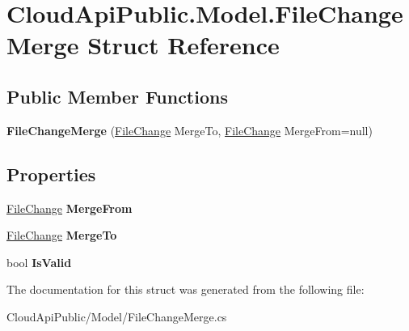 \hypertarget{struct_cloud_api_public_1_1_model_1_1_file_change_merge}{\section{Cloud\-Api\-Public.\-Model.\-File\-Change\-Merge Struct Reference}
\label{struct_cloud_api_public_1_1_model_1_1_file_change_merge}
}
\subsection*{Public Member Functions}
\begin{DoxyCompactItemize}
\item 
\hypertarget{struct_cloud_api_public_1_1_model_1_1_file_change_merge_ad841a9bbfbc41d406dabe10167b750ad}{{\bfseries File\-Change\-Merge} (\hyperlink{class_cloud_api_public_1_1_model_1_1_file_change}{File\-Change} Merge\-To, \hyperlink{class_cloud_api_public_1_1_model_1_1_file_change}{File\-Change} Merge\-From=null)}\label{struct_cloud_api_public_1_1_model_1_1_file_change_merge_ad841a9bbfbc41d406dabe10167b750ad}

\end{DoxyCompactItemize}
\subsection*{Properties}
\begin{DoxyCompactItemize}
\item 
\hypertarget{struct_cloud_api_public_1_1_model_1_1_file_change_merge_ae1e6fa957daa5680741c7f9bc136aff6}{\hyperlink{class_cloud_api_public_1_1_model_1_1_file_change}{File\-Change} {\bfseries Merge\-From}}\label{struct_cloud_api_public_1_1_model_1_1_file_change_merge_ae1e6fa957daa5680741c7f9bc136aff6}

\item 
\hypertarget{struct_cloud_api_public_1_1_model_1_1_file_change_merge_ae068338443b73adfa14ddf9c7c11b5ba}{\hyperlink{class_cloud_api_public_1_1_model_1_1_file_change}{File\-Change} {\bfseries Merge\-To}}\label{struct_cloud_api_public_1_1_model_1_1_file_change_merge_ae068338443b73adfa14ddf9c7c11b5ba}

\item 
\hypertarget{struct_cloud_api_public_1_1_model_1_1_file_change_merge_a2532bffa04b1f680998f65a67efca6e4}{bool {\bfseries Is\-Valid}}\label{struct_cloud_api_public_1_1_model_1_1_file_change_merge_a2532bffa04b1f680998f65a67efca6e4}

\end{DoxyCompactItemize}


The documentation for this struct was generated from the following file\-:\begin{DoxyCompactItemize}
\item 
Cloud\-Api\-Public/\-Model/File\-Change\-Merge.\-cs\end{DoxyCompactItemize}
